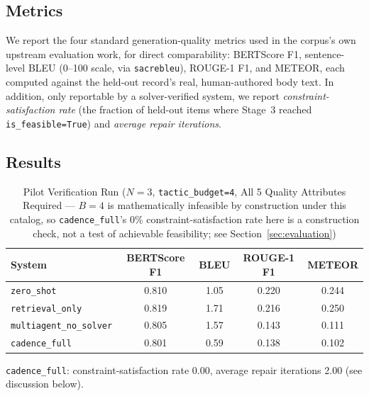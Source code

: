 \documentclass[lettersize,journal]{IEEEtran}
\begin{document}
\subsection{Metrics}

We report the four standard generation-quality metrics used in the corpus's own upstream evaluation work, for direct comparability: BERTScore F1, sentence-level BLEU (0--100 scale, via \texttt{sacrebleu}), ROUGE-1 F1, and METEOR, each computed against the held-out record's real, human-authored body text. In addition, only reportable by a solver-verified system, we report \emph{constraint-satisfaction rate} (the fraction of held-out items where Stage~3 reached \texttt{is\_feasible=True}) and \emph{average repair iterations}.

\subsection{Results}

\begin{table}[t]
\caption{Pilot Verification Run ($N=3$, \texttt{tactic\_budget=4}, All 5 Quality Attributes Required --- $B=4$ is mathematically infeasible by construction under this catalog, so \texttt{cadence\_full}'s 0\% constraint-satisfaction rate here is a construction check, not a test of achievable feasibility; see Section~\ref{sec:evaluation})\label{tab:pilot}}
\centering
\begin{tabular}{@{}lcccc@{}}
\toprule
System & BERTScore F1 & BLEU & ROUGE-1 F1 & METEOR \\
\midrule
\texttt{zero\_shot}            & 0.810 & 1.05 & 0.220 & 0.244 \\
\texttt{retrieval\_only}       & 0.819 & 1.71 & 0.216 & 0.250 \\
\texttt{multiagent\_no\_solver}& 0.805 & 1.57 & 0.143 & 0.111 \\
\texttt{cadence\_full}         & 0.801 & 0.59 & 0.138 & 0.102 \\
\bottomrule
\end{tabular}

\vspace{2pt}
\footnotesize \texttt{cadence\_full}: constraint-satisfaction rate 0.00, average repair iterations 2.00 (see discussion below).
\end{table}
\end{document}
